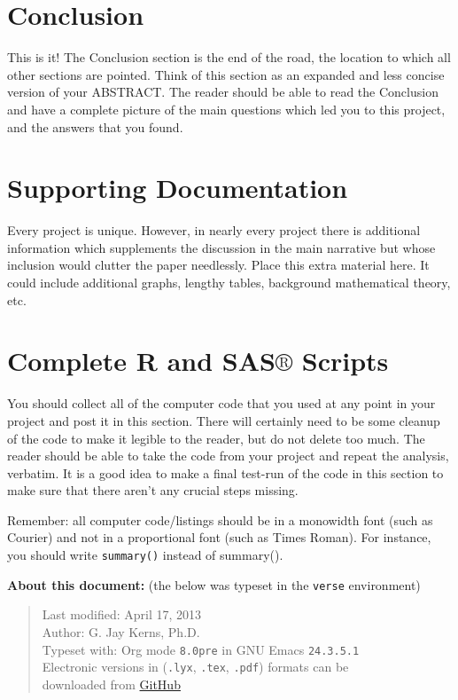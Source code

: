 \documentclass[11pt]{article}
\begin{document}
\newpage

\section[Conclusion]{Conclusion}
\label{sec-6}

This is it! The Conclusion section is the end of the road, the
location to which all other sections are pointed. Think of this
section as an expanded and less concise version of your ABSTRACT.  The
reader should be able to read the Conclusion and have a complete
picture of the main questions which led you to this project, and the
answers that you found.

\newpage
\appendix
\section[Supporting Documentation]{Supporting Documentation}
\label{sec-7}

Every project is unique. However, in nearly every project there is
additional information which supplements the discussion in the main
narrative but whose inclusion would clutter the paper
needlessly. Place this extra material here. It could include
additional graphs, lengthy tables, background mathematical theory,
etc.
\section[Complete R and SAS\(\circledR\) Scripts]{Complete R and SAS\(\circledR\) Scripts}
\label{sec-8}

You should collect all of the computer code that you used at any point
in your project and post it in this section. There will certainly need
to be some cleanup of the code to make it legible to the reader, but
do not delete too much. The reader should be able to take the code
from your project and repeat the analysis, verbatim. It is a good idea
to make a final test-run of the code in this section to make sure that
there aren't any crucial steps missing.

Remember: all computer code/listings should be in a monowidth font
(such as Courier) and not in a proportional font (such as Times
Roman). For instance, you should write \texttt{summary()} instead of
summary().

\bigskip

\textbf{About this document:} (the below was typeset in the \texttt{verse}
environment)

\begin{verse}
Last modified: April 17, 2013 \\
Author: G. Jay Kerns, Ph.D. \\
Typeset with: Org mode \texttt{8.0pre} in GNU Emacs \texttt{24.3.5.1} \\
Electronic versions in (\texttt{.lyx}, \texttt{.tex}, \texttt{.pdf}) formats can be \\
downloaded from \href{https://github.com/gjkerns/gradproject}{GitHub} \\
\end{verse}

{}


\end{document}
